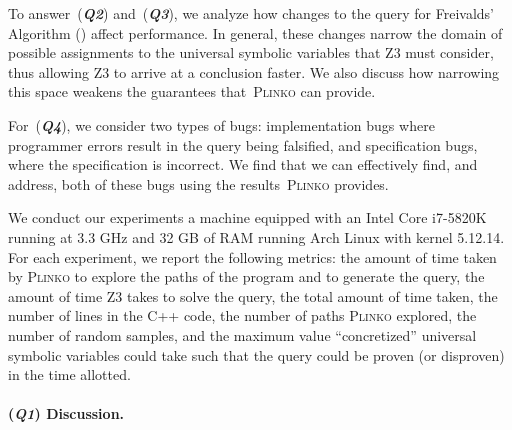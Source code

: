 \documentclass[acmsmall,review,anonymous]{acmart}\settopmatter{printfolios=true,printccs=false,printacmref=false}
\newcommand{\SYSTEM}{\textsc{Plinko}\xspace}
\newcommand{\Q}[1]{(\textit{\textbf{Q#1}})}
\begin{document}
To answer~\Q{2} and~\Q{3}, we analyze how changes to the query for Freivalds' Algorithm () affect performance.
% 
In general, these changes narrow the domain of possible assignments to the universal symbolic variables that Z3 must consider, thus allowing Z3 to arrive at a conclusion faster.
%
We also discuss how narrowing this space weakens the guarantees that~\SYSTEM can provide.
% 

For~\Q{4}, we consider two types of bugs: implementation bugs where programmer errors result in the query being falsified, and specification bugs, where the specification is incorrect.
%
We find that we can effectively find, and address, both of these bugs using the results~\SYSTEM provides.


We conduct our experiments a machine equipped with an Intel Core i7-5820K running at 3.3 GHz and 32 GB of RAM running Arch Linux with kernel 5.12.14.
% 
For each experiment, we report the following metrics: the amount of time taken by \SYSTEM to explore the paths of the program and to generate the query, the amount of time Z3 takes to solve the query, the total amount of time taken, the number of lines in the C++ code, the number of paths \SYSTEM  explored, the number of random samples, and the maximum value ``concretized'' universal symbolic variables could take such that the query could be proven (or disproven) in the time allotted.

\paragraph*{\Q{1} Discussion.}
\end{document}
